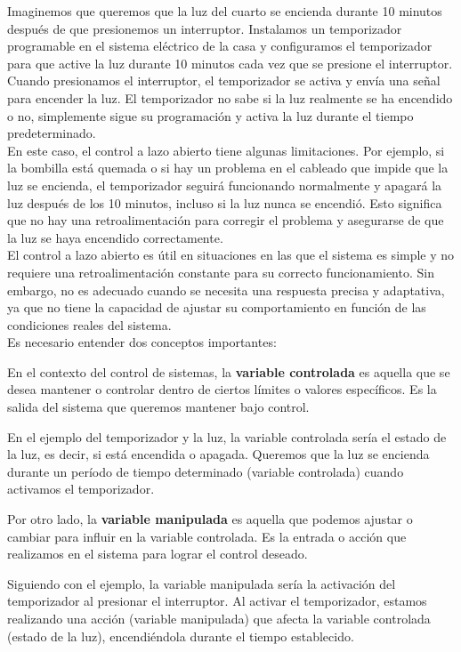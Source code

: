 \documentclass[
	12pt, %
	fleqn, %
	a4paper, %
	oneside, %
]{LegrandOrangeBook}
\begin{document}
Imaginemos que queremos que la luz del cuarto se encienda durante 10 minutos después de que presionemos un interruptor. Instalamos un temporizador programable en el sistema eléctrico de la casa y configuramos el temporizador para que active la luz durante 10 minutos cada vez que se presione el interruptor.\\
Cuando presionamos el interruptor, el temporizador se activa y envía una señal para encender la luz. El temporizador no sabe si la luz realmente se ha encendido o no, simplemente sigue su programación y activa la luz durante el tiempo predeterminado.\\
En este caso, el control a lazo abierto tiene algunas limitaciones. Por ejemplo, si la bombilla está quemada o si hay un problema en el cableado que impide que la luz se encienda, el temporizador seguirá funcionando normalmente y apagará la luz después de los 10 minutos, incluso si la luz nunca se encendió. Esto significa que no hay una retroalimentación para corregir el problema y asegurarse de que la luz se haya encendido correctamente.\\
El control a lazo abierto es útil en situaciones en las que el sistema es simple y no requiere una retroalimentación constante para su correcto funcionamiento. Sin embargo, no es adecuado cuando se necesita una respuesta precisa y adaptativa, ya que no tiene la capacidad de ajustar su comportamiento en función de las condiciones reales del sistema.\\
Es necesario entender dos conceptos importantes:
\begin{definition}
En el contexto del control de sistemas, la \textbf{variable controlada} es aquella que se desea mantener o controlar dentro de ciertos límites o valores específicos. Es la salida del sistema que queremos mantener bajo control.
\end{definition}
En el ejemplo del temporizador y la luz, la variable controlada sería el estado de la luz, es decir, si está encendida o apagada. Queremos que la luz se encienda durante un período de tiempo determinado (variable controlada) cuando activamos el temporizador.
\begin{definition}
Por otro lado, la \textbf{variable manipulada} es aquella que podemos ajustar o cambiar para influir en la variable controlada. Es la entrada o acción que realizamos en el sistema para lograr el control deseado.
\end{definition}
Siguiendo con el ejemplo, la variable manipulada sería la activación del temporizador al presionar el interruptor. Al activar el temporizador, estamos realizando una acción (variable manipulada) que afecta la variable controlada (estado de la luz), encendiéndola durante el tiempo establecido.\\
\end{document}
